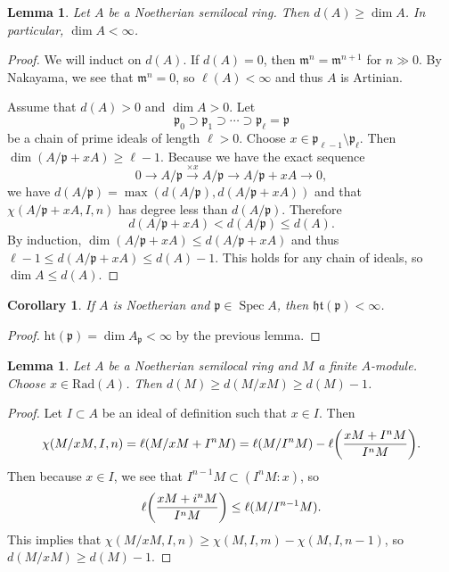 \documentclass[leqno, openany]{memoir}
\newtheorem{cor}[thm]{Corollary}
\newtheorem{lem}[thm]{Lemma}
\theoremstyle{definition}
\theoremstyle{remark}
\theoremstyle{plain}
\theoremstyle{definition}
\theoremstyle{remark}
\newcommand{\mf}[1]{\mathfrak{#1}}
\newcommand{\mr}[1]{\mathrm{#1}}
\DeclareMathOperator{\Spec}{Spec}
\begin{document}
\begin{lem} Let $A$ be a Noetherian semilocal ring. Then $d(A) \geq \dim A$. In
particular, $\dim A < \infty$.  \end{lem}

\begin{proof} We will induct on $d(A)$. If $d(A) = 0$, then $\mf{m}^n =
    \mf{m}^{n+1}$ for $n \gg 0$. By Nakayama, we see that $\mf{m}^n = 0$, so
    $\ell(A) < \infty$ and thus $A$ is Artinian.

    Assume that $d(A) > 0$ and $\dim A > 0$. Let \[ \mf{p}_0 \supset \mf{p}_1
    \supset \cdots \supset \mf{p}_{\ell} = \mf{p} \] be a chain of prime ideals
    of length $\ell > 0$. Choose $x \in \mf{p}_{\ell - 1} \setminus
    \mf{p}_{\ell}$. Then $\dim (A / \mf{p} + xA) \geq \ell - 1$. Because we
    have the exact sequence \[ 0 \to A/\mf{p} \xrightarrow{\times x} A/\mf{p}
    \to A/\mf{p} + xA \to 0, \] we have $d(A/\mf{p}) = \max (d(A/\mf{p}),
    d(A/\mf{p}+xA))$ and that $ \chi(A/\mf{p}+xA, I,n)$ has degree less than
    $d(A/\mf{p})$. Therefore \[ d(A/\mf{p}+xA) < d(A/\mf{p}) \leq d(A). \] By
    induction, $\dim(A/\mf{p}+xA) \leq d(A/\mf{p}+xA)$ and thus $\ell - 1 \leq
    d(A/\mf{p}+xA) \leq d(A) - 1$. This holds for any chain of ideals, so $\dim
    A \leq d(A)$.  \end{proof}

\begin{cor} If $A$ is Noetherian and $\mf{p} \in \Spec A$, then
$\mf{ht}(\mf{p}) < \infty$.  \end{cor}

\begin{proof} $\mr{ht}(\mf{p}) = \dim A_{\mf{p}} < \infty$ by the previous
lemma.  \end{proof}

\begin{lem} Let $A$ be a Noetherian semilocal ring and $M$ a finite $A$-module.
Choose $x \in \mr{Rad}(A)$. Then $d(M) \geq d(M/xM) \geq d(M) - 1$.  \end{lem}

\begin{proof} Let $I \subset A$ be an ideal of definition such that $x \in I$.
    Then \[ \chi(M/xM,I,n) = \ell(M/xM + I^nM) = \ell(M / I^nM) -
    \ell\qty(\frac{xM + I^nM}{I^nM}). \] Then because $x \in I$, we see that
    $I^{n-1}M \subset (I^n M : x)$, so \[ \ell \qty(\frac{xM + i^nM}{I^nM})
    \leq \ell(M / I^{n-1}M). \] This implies that $\chi(M / xM, I, n) \geq
\chi(M, I, m) - \chi(M, I, n-1)$, so $d(M/xM) \geq d(M) - 1$.  \end{proof}
\end{document}
